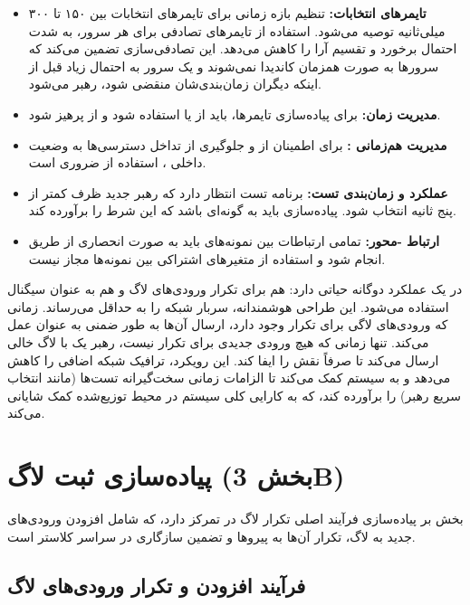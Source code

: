 \documentclass[12pt,a4paper]{article}
\begin{document}
\begin{itemize}
    \item \textbf{تایمرهای انتخابات:} تنظیم بازه زمانی برای تایمرهای انتخابات بین ۱۵۰ تا ۳۰۰ میلی‌ثانیه توصیه می‌شود. استفاده از تایمرهای تصادفی  برای هر سرور، به شدت احتمال برخورد و تقسیم آرا  را کاهش می‌دهد. این تصادفی‌سازی تضمین می‌کند که سرورها به صورت همزمان کاندیدا نمی‌شوند و یک سرور به احتمال زیاد قبل از اینکه دیگران زمان‌بندی‌شان منقضی شود، رهبر می‌شود.
    \item \textbf{مدیریت زمان:} برای پیاده‌سازی تایمرها، باید از  یا  استفاده شود و از  پرهیز شود.
    \item \textbf{مدیریت هم‌زمانی :} برای اطمینان از  و جلوگیری از تداخل دسترسی‌ها به وضعیت داخلی ، استفاده از  ضروری است.
    \item \textbf{عملکرد و زمان‌بندی تست:} برنامه تست انتظار دارد که رهبر جدید ظرف کمتر از پنج ثانیه انتخاب شود. پیاده‌سازی باید به گونه‌ای باشد که این شرط را برآورده کند.
    \item \textbf{ارتباط -محور:} تمامی ارتباطات بین نمونه‌های  باید به صورت انحصاری از طریق  انجام شود و استفاده از متغیرهای اشتراکی بین نمونه‌ها مجاز نیست.
\end{itemize}

 در  یک عملکرد دوگانه حیاتی دارد: هم برای تکرار ورودی‌های لاگ و هم به عنوان سیگنال  استفاده می‌شود. این طراحی هوشمندانه، سربار شبکه را به حداقل می‌رساند. زمانی که ورودی‌های لاگی برای تکرار وجود دارد، ارسال آن‌ها به طور ضمنی به عنوان  عمل می‌کند. تنها زمانی که هیچ ورودی جدیدی برای تکرار نیست، رهبر یک  با لاگ خالی ارسال می‌کند تا صرفاً نقش  را ایفا کند. این رویکرد، ترافیک شبکه اضافی را کاهش می‌دهد و به سیستم کمک می‌کند تا الزامات زمانی سخت‌گیرانه تست‌ها (مانند انتخاب سریع رهبر) را برآورده کند، که به کارایی کلی سیستم در محیط توزیع‌شده کمک شایانی می‌کند.

\section{پیاده‌سازی ثبت لاگ (بخش 3B)}

بخش  بر پیاده‌سازی فرآیند اصلی تکرار لاگ در  تمرکز دارد، که شامل افزودن ورودی‌های جدید به لاگ، تکرار آن‌ها به پیروها و تضمین سازگاری در سراسر کلاستر است.

\subsection{فرآیند افزودن و تکرار ورودی‌های لاگ}
\end{document}

